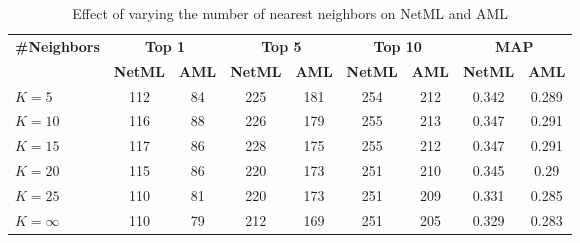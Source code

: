 


\begin{table*}
	\centering
	\caption{Effect of varying the number of nearest neighbors on NetML and AML}
\begin{tabular}{|l|c|c|c|c|c|c|c|c|}
	\hline 
	\multirow{2}{*}{\textbf{\#Neighbors}} & \multicolumn{2}{c|}{\textbf{Top 1}} & \multicolumn{2}{c|}{\textbf{Top 5}} & \multicolumn{2}{c|}{\textbf{Top 10}} & \multicolumn{2}{c|}{\textbf{MAP}}\\
	\cline{2-9} 
	& \textbf{NetML} & \textbf{AML} & \textbf{NetML} & \textbf{AML} & \textbf{NetML} & \textbf{AML} & \textbf{NetML} & \textbf{AML}\\
	\hline 
	\hline
	$K=5$ & 112   & 84    & 225   & 181   & 254   & 212   & 0.342 & 0.289 \\
	$K=10$ & 116   & 88    & 226   & 179   & 255   & 213   & 0.347 & 0.291 \\
	$K=15$ & 117   & 86    & 228   & 175   & 255   & 212   & 0.347 & 0.291\\
	$K=20$ & 115   & 86    & 220   & 173   & 251   & 210   & 0.345 & 0.29 \\
	$K=25$& 110   & 81    & 220   & 173   & 251   & 209   & 0.331 & 0.285 \\
	$K=\infty$  & 110   & 79    & 212   & 169   & 251   & 205   & 0.329 & 0.283 \\
	\hline
\end{tabular}

\label{tab:varying_neighbors}
\end{table*}




